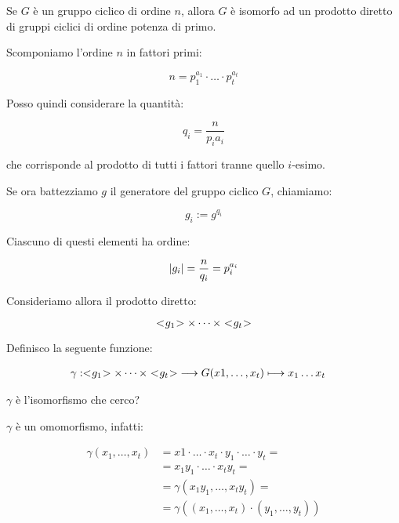 \begin{teorema}
	Se $G$ è un gruppo ciclico di ordine $n$, allora $G$ è isomorfo ad un prodotto diretto di gruppi ciclici di ordine potenza di primo.
\end{teorema}
\begin{dimostrazione}
	Scomponiamo l'ordine $n$ in fattori primi:
	
	\begin{equation}
		n = p_1^{a_1} \cdot \dots \cdot p_t^{a_t}
	\end{equation}

	Posso quindi considerare la quantità:
	
	\begin{equation}
		q_i = \dfrac{n}{p_i{a_i}}
	\end{equation}

	che corrisponde al prodotto di tutti i fattori tranne quello $i$-esimo.
	
	Se ora battezziamo $g$ il generatore del gruppo ciclico $G$, chiamiamo:
	
	\begin{equation}
		g_i := g^{q_i}
	\end{equation}

	Ciascuno di questi elementi ha ordine:
	
	\begin{equation}
		\lvert g_i \rvert = \dfrac{n}{q_i} = p_i^{a_i}
	\end{equation}

	Consideriamo allora il prodotto diretto:
	
	\begin{equation}
		< \negmedspace g_1 \negmedspace > \times \dots \times < \negmedspace g_t \negmedspace >
	\end{equation}

	Definisco la seguente funzione:
	
	\begin{align}
		\gamma: < \negmedspace g_1 \negmedspace > \times \dots \times < \negmedspace g_t \negmedspace > &\longrightarrow G
		(x1, \dots, x_t) \longmapsto x_1 \dots x_t
	\end{align}

	$\gamma$ è l'isomorfismo che cerco?
	
	$\gamma$ è un omomorfismo, infatti:
	
	\begin{align}
		\gamma(x_1, \dots, x_t) &= x1 \cdot \dots \cdot x_t \cdot y_1 \cdot \dots \cdot y_t = \\
		&= x_1y_1 \cdot \dots \cdot x_ty_t =  \\
		&= \gamma(x_1y_1, \dots, x_ty_t) = \\
		&= \gamma((x_1, \dots, x_t) \cdot (y_1, \dots, y_t))
	\end{align}


\end{dimostrazione}
